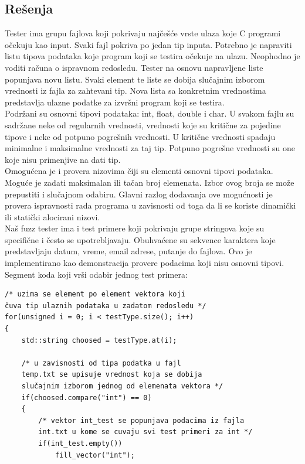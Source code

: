 \documentclass[a4paper]{article}
\begin{document}
{\subsection{Rešenja}
\label{subsec:resenja_koje_nudi_tester}

Tester ima grupu fajlova koji pokrivaju najčešće vrste ulaza koje C programi očekuju kao input. Svaki fajl pokriva po jedan tip inputa. Potrebno je napraviti listu tipova podataka koje program koji se testira očekuje na ulazu. Neophodno je voditi računa o ispravnom redosledu. Tester na osnovu napravljene liste popunjava novu listu. Svaki element te liste se dobija slučajnim izborom vrednosti iz fajla za zahtevani tip. Nova lista sa konkretnim vrednostima predstavlja ulazne podatke za izvršni program koji se testira. \\

Podržani su osnovni tipovi podataka: int, float, double i char. U svakom fajlu su sadržane neke od regularnih vrednosti, vrednosti koje su kritične za pojedine tipove i neke od potpuno pogrešnih vrednosti. U kritične vrednosti spadaju minimalne i maksimalne vrednosti za taj tip. Potpuno pogrešne vrednosti su one koje nisu primenjive na dati tip. \\

Omogućena je i provera nizovima čiji su elementi osnovni tipovi podataka. Moguće je zadati maksimalan ili tačan broj elemenata. Izbor ovog broja se može prepustiti i slučajnom odabiru. Glavni razlog dodavanja ove mogućnosti je provera ispravnosti rada programa u zavisnosti od toga da li se koriste dinamički ili statički alocirani nizovi. \\

Naš fuzz tester ima i test primere koji pokrivaju grupe stringova koje su specifične i često se upotrebljavaju. Obuhvaćene su sekvence karaktera koje predstavljaju datum, vreme, email adrese, putanje do fajlova. Ovo je implementirano kao demonstracija provere podacima koji nisu osnovni tipovi. \\

Segment koda koji vrši odabir jednog test primera:
\begin{verbatim}
/* uzima se element po element vektora koji 
čuva tip ulaznih podataka u zadatom redosledu */
for(unsigned i = 0; i < testType.size(); i++)
{
    std::string choosed = testType.at(i);
    
    /* u zavisnosti od tipa podatka u fajl 
    temp.txt se upisuje vrednost koja se dobija 
    slučajnim izborom jednog od elemenata vektora */
    if(choosed.compare("int") == 0)
    {
        /* vektor int_test se popunjava podacima iz fajla
        int.txt u kome se cuvaju svi test primeri za int */
        if(int_test.empty())
            fill_vector("int"); 
                 

\end{verbatim}}
\end{document}
